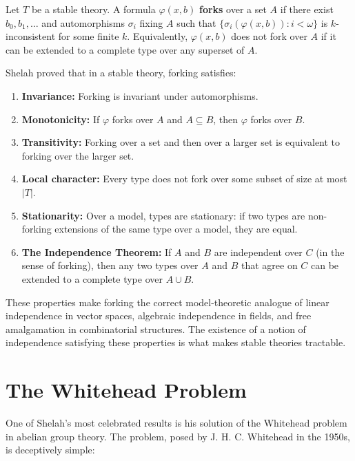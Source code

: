 \begin{definition}[Forking]
Let \(T\) be a stable theory. A formula \(\varphi(x,b)\) \textbf{forks} over a set \(A\) if there exist \(b_0,b_1,\dots\) and automorphisms \(\sigma_i\) fixing \(A\) such that \(\{\sigma_i(\varphi(x,b)) : i < \omega\}\) is \(k\)-inconsistent for some finite \(k\). Equivalently, \(\varphi(x,b)\) does not fork over \(A\) if it can be extended to a complete type over any superset of \(A\).
\end{definition}

Shelah proved that in a stable theory, forking satisfies:
\begin{enumerate}
    \item \textbf{Invariance:} Forking is invariant under automorphisms.
    \item \textbf{Monotonicity:} If \(\varphi\) forks over \(A\) and \(A \subseteq B\), then \(\varphi\) forks over \(B\).
    \item \textbf{Transitivity:} Forking over a set and then over a larger set is equivalent to forking over the larger set.
    \item \textbf{Local character:} Every type does not fork over some subset of size at most \(|\!T\!|\).
    \item \textbf{Stationarity:} Over a model, types are stationary: if two types are non-forking extensions of the same type over a model, they are equal.
    \item \textbf{The Independence Theorem:} If \(A\) and \(B\) are independent over \(C\) (in the sense of forking), then any two types over \(A\) and \(B\) that agree on \(C\) can be extended to a complete type over \(A \cup B\).
\end{enumerate}

These properties make forking the correct model-theoretic analogue of linear independence in vector spaces, algebraic independence in fields, and free amalgamation in combinatorial structures. The existence of a notion of independence satisfying these properties is what makes stable theories tractable.

\section{The Whitehead Problem}

One of Shelah's most celebrated results is his solution of the Whitehead problem in abelian group theory. The problem, posed by J. H. C. Whitehead in the 1950s, is deceptively simple:

